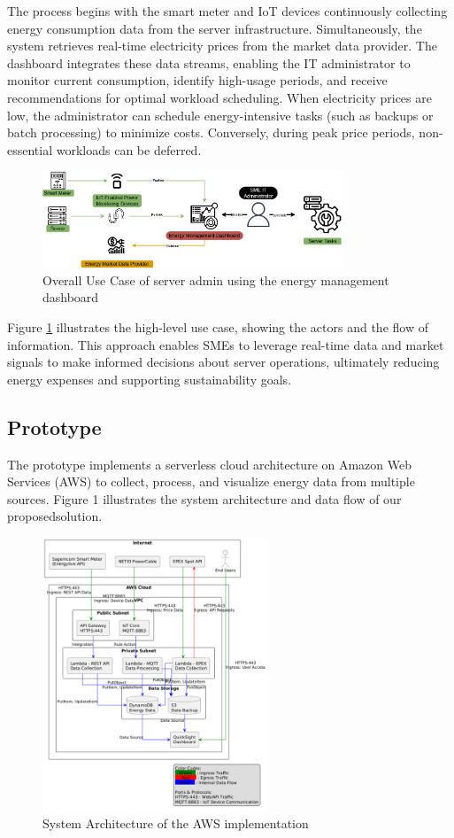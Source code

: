 The process begins with the smart meter and IoT devices continuously collecting energy consumption data from the server infrastructure. Simultaneously, the system retrieves real-time electricity prices from the market data provider. The dashboard integrates these data streams, enabling the IT administrator to monitor current consumption, identify high-usage periods, and receive recommendations for optimal workload scheduling. When electricity prices are low, the administrator can schedule energy-intensive tasks (such as backups or batch processing) to minimize costs. Conversely, during peak price periods, non-essential workloads can be deferred. 
\begin{figure}[htbp]
    \centering
    \includegraphics[width=0.8\textwidth]{fig/high_level_use_case.png}
    \caption{Overall Use Case of server admin using the energy management dashboard}
    \label{fig:highleveluse}
\end{figure}
Figure \ref{fig:highleveluse} illustrates the high-level use case, showing the actors and the flow of information. This approach enables SMEs to leverage real-time data and market signals to make informed decisions about server operations, ultimately reducing energy expenses and supporting sustainability goals.

\subsection{Prototype}
The prototype implements a serverless cloud architecture on Amazon Web Services (AWS) to collect,
process, and visualize energy data from multiple sources. Figure 1 illustrates the system
architecture and data flow of our proposedsolution.

\begin{figure}[htbp]
    \centering
    \includegraphics[width=0.6\textwidth]{fig/architecture2.png}
    \caption{System Architecture of the AWS implementation}
    \label{fig:architecture}
\end{figure}

